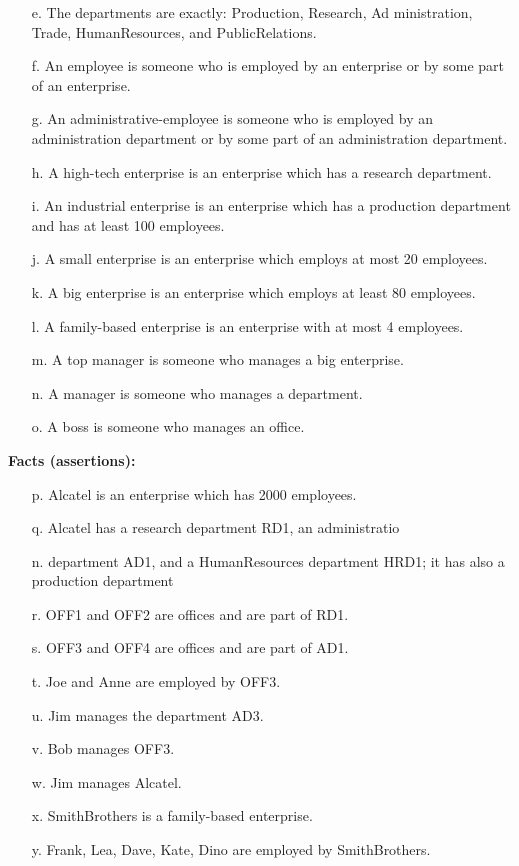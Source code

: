\documentclass[11pt]{article}
\begin{document}
\begin{itemize}
    \item[e.] The departments are exactly: Production, Research, Ad
ministration, Trade, HumanResources, and PublicRelations.
\item[f.] An employee is someone who is employed by an enterprise or by some part of an enterprise.
\item[g.] An administrative-employee is someone who is employed by an administration department or by some part of an administration department.
\item[h.] A high-tech enterprise is an enterprise which has a research department.
\item[i.] An industrial enterprise is an enterprise which has a production department and has at least 100 employees.
\item[j.] A small enterprise is an enterprise which employs at most 20 employees.
\item[k.] A big enterprise is an enterprise which employs at least 80 employees.
\item[l.] A family-based enterprise is an enterprise with at most 4 employees.
\item[m.] A top manager is someone who manages a big enterprise.
\item[n.] A manager is someone who manages a department.
\item[o.] A boss is someone who manages an office.
\end{itemize}

\noindent\textbf{Facts (assertions):}
\begin{itemize}
    \item[p.] Alcatel is an enterprise which has 2000 employees.
    \item[q.] Alcatel has a research department RD1, an administratio
    \item[n.] department AD1, and a HumanResources department HRD1; it has also a production department
    \item[r.] OFF1 and OFF2 are offices and are part of RD1.
    \item[s.] OFF3 and OFF4 are offices and are part of AD1.
    \item[t.] Joe and Anne are employed by OFF3.
    \item[u.] Jim manages the department AD3.
    \item[v.] Bob manages OFF3.
    \item[w.] Jim manages Alcatel.
    \item[x.] SmithBrothers is a family-based enterprise.
    \item[y.] Frank, Lea, Dave, Kate, Dino are employed by SmithBrothers.
\end{itemize}
\end{document}

